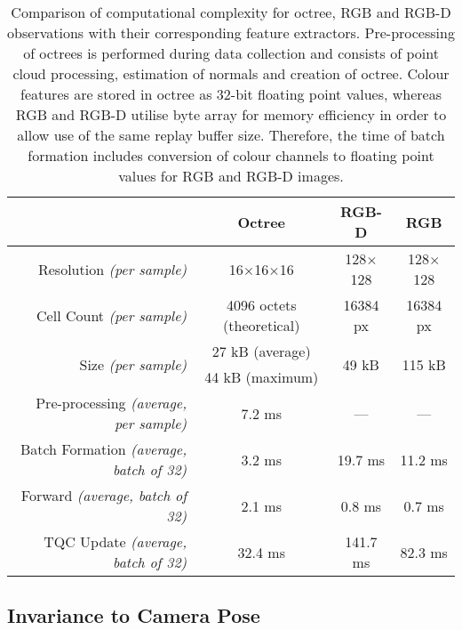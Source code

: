 \begin{table}[ht]
    \centering
    \begin{tabular}{r|ccc}
                                                        &
        \textbf{Octree}                                 & \textbf{RGB-D}             & \textbf{RGB}                                     \\ \hline
        Resolution \textit{(per sample)}                & 16\(\times\)16\(\times\)16 & 128\(\times\)128       & 128\(\times\)128        \\
        Cell Count \textit{(per sample)}                & 4096 octets (theoretical)  & 16384 px               & 16384 px                \\
        \multirow{2}{*}{Size \textit{(per sample)}}     & 27 kB (average)            & \multirow{2}{*}{49 kB} & \multirow{2}{*}{115 kB} \\
                                                        & 44 kB (maximum)            &                        &                         \\ \hline
        Pre-processing \textit{(average, per sample)}   & 7.2 ms                     & ---                    & ---                     \\
        Batch Formation \textit{(average, batch of 32)} & 3.2 ms                     & 19.7 ms                & 11.2 ms                 \\
        Forward \textit{(average, batch of 32)}         & 2.1 ms                     & 0.8 ms                 & 0.7 ms                  \\
        TQC Update \textit{(average, batch of 32)}      & 32.4 ms                    & 141.7 ms               & 82.3 ms
    \end{tabular}
    \caption{Comparison of computational complexity for octree, RGB and RGB-D observations with their corresponding feature extractors. Pre-processing of octrees is performed during data collection and consists of point cloud processing, estimation of normals and creation of octree. Colour features are stored in octree as 32-bit floating point values, whereas RGB and RGB-D utilise byte array for memory efficiency in order to allow use of the same replay buffer size. Therefore, the time of batch formation includes conversion of colour channels to floating point values for RGB and RGB-D images.}
    \label{tab:feature_extractor_memory_and_computational_time}
\end{table}


\subsection{Invariance to Camera Pose}

